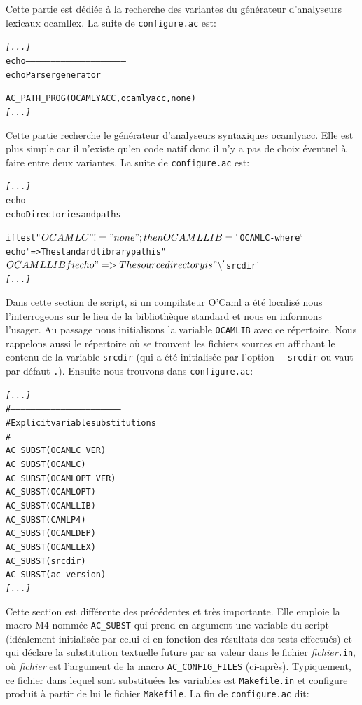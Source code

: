 \documentclass[11pt,a4paper]{article}
\begin{document}
\noindent Cette partie est dédiée à la recherche des variantes du
générateur d'analyseurs lexicaux \textsf{ocamllex}. La suite de
\texttt{configure.ac} est:

{\small
\begin{alltt}
\emph{[...]}
echo -----------------------------------------------------------
echo Parser generator

AC_PATH_PROG(OCAMLYACC,ocamlyacc,none)
\emph{[...]}
\end{alltt}
}

\noindent Cette partie recherche le générateur d'analyseurs
syntaxiques \textsf{ocamlyacc}. Elle est plus simple car il n'existe
qu'en code natif donc il n'y a pas de choix éventuel à faire entre
deux variantes. La suite de \texttt{configure.ac} est:

{\small
\begin{alltt}
\emph{[...]}
echo -----------------------------------------------------------
echo Directories and paths

if test "$OCAMLC" != "none";
then
  OCAMLLIB=`$OCAMLC -where`
  echo "  => The standard library path is" $OCAMLLIB
fi
echo "  => The source directory is" \symbol{92}'$srcdir'
\emph{[...]}
\end{alltt}
}

\noindent Dans cette section de script, si un compilateur O'Caml a été
localisé nous l'interrogeons sur le lieu de la bibliothèque standard
et nous en informons l'usager. Au passage nous initialisons la
variable \texttt{OCAMLIB} avec ce répertoire. Nous rappelons aussi le
répertoire où se trouvent les fichiers sources en affichant le contenu
de la variable \texttt{srcdir} (qui a été initialisée par l'option
\verb|--srcdir| ou vaut par défaut \texttt{.}). Ensuite nous trouvons
dans \texttt{configure.ac}:

{\small
\begin{alltt}
\emph{[...]}
# ------------------------------------------------------------------
# Explicit variable substitutions
#
AC_SUBST(OCAMLC_VER)
AC_SUBST(OCAMLC)
AC_SUBST(OCAMLOPT_VER)
AC_SUBST(OCAMLOPT)
AC_SUBST(OCAMLLIB)
AC_SUBST(CAMLP4)
AC_SUBST(OCAMLDEP)
AC_SUBST(OCAMLLEX)
AC_SUBST(srcdir)
AC_SUBST(ac_version)
\emph{[...]}
\end{alltt}
}

\noindent Cette section est différente des précédentes et très
importante. Elle emploie la macro \textsf{M4} nommée
\texttt{AC\_SUBST} qui prend en argument une variable du script
(idéalement initialisée par celui-ci en fonction des résultats des
tests effectués) et qui déclare la substitution textuelle future par sa
valeur dans le fichier \emph{fichier}\texttt{.in}, où \emph{fichier}
est l'argument de la macro \texttt{AC\_CONFIG\_FILES}
(ci-après). Typiquement, ce fichier dans lequel sont substituées les
variables est \texttt{Makefile.in} et \textsf{configure} produit à
partir de lui le fichier \texttt{Makefile}. La fin de
\texttt{configure.ac} dit:
\end{document}
